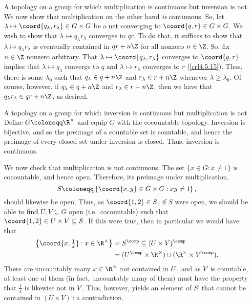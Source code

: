 \begin{exm}{A topology on a group for which multiplication is continuous but inversion is not}{}
We now show that multiplication on the other hand \emph{is} continuous.  So, let $\lambda \mapsto \coord{q_{\lambda},r_{\lambda}}\in G\times G$ be a net converging to $\coord{q,r}\in G\times G$.  We wish to show that $\lambda \mapsto q_{\lambda}r_{\lambda}$ converges to $qr$.  To do that, it suffices to show that $\lambda \mapsto q_{\lambda}r_{\lambda}$ is eventually contained in $qr+n\Z$ for all nonzero $n\in \Z$.  So, fix $n\in \Z$ nonzero arbitrary.  That $\lambda \mapsto \coord{q_{\lambda},r_{\lambda}}$ converges to $\coord{q,r}$ implies that $\lambda \mapsto q_{\lambda}$ converge to $q$ and $\lambda \mapsto r_{\lambda}$ converges to $r$ (\cref{crl4.5.15}).  Thus, there is some $\lambda _0$ such that $q_{\lambda}\in q+n\Z$ and $r_{\lambda}\in r+n\Z$ whenever $\lambda \geq \lambda _0$.  Of course, however, if $q_{\lambda}\in q+n\Z$ and $r_{\lambda}\in r+n\Z$, then we have that $q_{\lambda}r_{\lambda}\in qr+n\Z$, as desired.
\end{exm}
\begin{exm}{A topology on a group for which inversion is continuous but multiplication is not}{}
Define $G\coloneqq \R ^{\times}$ and equip $G$ with the cocountable topology.  Inversion is bijective, and so the preimage of a countable set is countable, and hence the preimage of every closed set under inversion is closed.  Thus, inversion is continuous.

We now check that multiplication is not continuous.  The set $\{ x\in G:x\neq 1\}$ is cocountable, and hence open.  Therefore, its preimage under multiplication,
\begin{equation}
S\coloneqq \left\{ \coord{x,y}\in G\times G:xy\neq 1\right\} ,
\end{equation}
should likewise be open.  Thus, as $\coord{1,2}\in S$, if $S$ were open, we should be able to find $U,V\subseteq G$ open (i.e.~cocountable) such that $\coord{1,2}\in U\times V\subseteq S$.  If this were true, then in particular we would have that
\begin{equation}
\begin{split}
\left\{ \coord{x,\tfrac{1}{x}}:x\in \R ^{\times}\right\} & =S^{\comp}\subseteq (U\times V)^{\comp} \\
& =(U^{\comp}\times \R ^{\times})\cup (\R ^{\times}\times V^{\comp}).
\end{split}
\end{equation}
There are uncountably many $x\in \R ^{\times}$ not contained in $U^{\comp}$, and as $V^{\comp}$ is countable, at least one of them (in fact, uncountably many of them) must have the property that $\frac{1}{x}$ is likewise not in $V^{\comp}$.  This, however, yields an element of $S^{\comp}$ that cannot be contained in $(U\times V)^{\comp}$:  a contradiction.
\end{exm}
